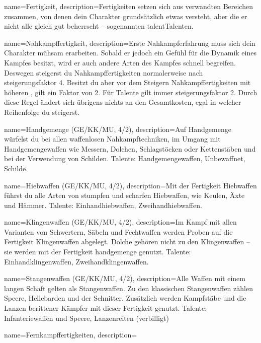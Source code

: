 {
    name={Fertigkeit},
    description={Fertigkeiten setzen sich aus verwandten Bereichen zusammen, von denen dein Charakter grundsätzlich etwas versteht, aber die er nicht alle gleich gut beherrscht – sogenannten \gls{talent}{Talenten}.}}

{
    name={Nahkampffertigkeit},
    description={Erste Nahkampferfahrung muss sich dein Charakter mühsam erarbeiten. Sobald er jedoch ein Gefühl für die Dynamik eines Kampfes besitzt, wird er auch andere Arten des Kampfes schnell begreifen. Deswegen steigerst du Nahkampffertigkeiten normalerweise nach \gls{steigerungsfaktor} 4. Besitzt du aber vor dem Steigern Nahkampffertigkeiten mit höheren , gilt ein Faktor von 2. Für Talente gilt immer \gls{steigerungsfaktor} 2. Durch diese Regel ändert sich übrigens nichts an den Gesamtkosten, egal in welcher Reihenfolge du steigerst.}}

{
    name={Handgemenge (GE/KK/MU, 4/2)},
    description={Auf Handgemenge würfelst du bei allen waffenlosen Nahkampftechniken, im Umgang mit Handgemengewaffen wie Messern, Dolchen, Schlagstöcken oder Kettenstäben und bei der Verwendung von Schilden. Talente: Handgemengewaffen, Unbewaffnet, Schilde.}}

{
    name={Hiebwaffen (GE/KK/MU, 4/2)},
    description={Mit der Fertigkeit Hiebwaffen führst du alle Arten von stumpfen und scharfen Hiebwaffen, wie Keulen, Äxte und Hämmer. Talente: Einhandhiebwaffen, Zweihandhiebwaffen.}}

{
    name={Klingenwaffen (GE/KK/MU, 4/2)},
    description={Im Kampf mit allen Varianten von Schwertern, Säbeln und Fechtwaffen werden Proben auf die Fertigkeit Klingenwaffen abgelegt. Dolche gehören nicht zu den Klingenwaffen – sie werden mit der Fertigkeit \gls{handgemenge} genutzt. Talente: Einhandklingenwaffen, Zweihandklingenwaffen.}}

{
    name={Stangenwaffen (GE/KK/MU, 4/2)},
    description={Alle Waffen mit einem langen Schaft gelten als Stangenwaffen. Zu den klassischen Stangenwaffen zählen Speere, Hellebarden und der Schnitter. Zusätzlich werden Kampfstäbe und die Lanzen berittener Kämpfer mit dieser Fertigkeit genutzt. Talente: Infanteriewaffen und Speere, Lanzenreiten (\gls{verbilligt})}}

{
    name={Fernkampffertigkeiten},
    description={}}

